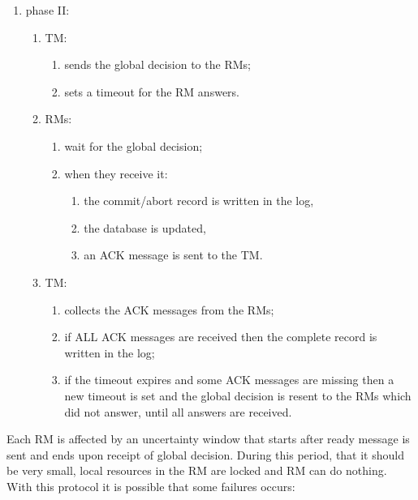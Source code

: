 \begin{enumerate}
\begin{enumerate}
\begin{enumerate}
		\end{enumerate}
	\end{enumerate}
	\item phase II:
	\begin{enumerate}
		\item TM:
		\begin{enumerate}
			\item sends the global decision to the RMs;
			\item sets a timeout for the RM answers.
		\end{enumerate}
		\item RMs:
		\begin{enumerate}
			\item wait for the global decision;
			\item when they receive it:
			\begin{enumerate}
				\item the commit/abort record is written in the log,
				\item the database is updated,
				\item an ACK message is sent to the TM.
			\end{enumerate}
		\end{enumerate}
		\item TM:
		\begin{enumerate}
			\item collects the ACK messages from the RMs;
			\item if ALL ACK messages are received then the complete record is written in the log;
			\item if the timeout expires and some ACK messages are missing then a new timeout is set and the global decision is resent to the RMs which did not answer, until all answers are received.
		\end{enumerate}
	\end{enumerate}
\end{enumerate}
Each RM is affected by an uncertainty window that starts after ready message is sent and ends upon receipt of global decision.
During this period, that it should be very small, local resources in the RM are locked and RM can do nothing.
With this protocol it is possible that some failures occurs:
